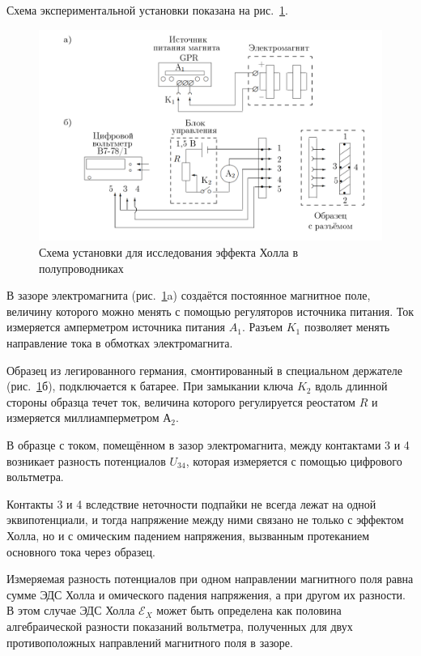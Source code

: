 \documentclass[a4paper, 12pt]{article}
\begin{document}
Схема экспериментальной установки показана на рис.~\ref{ris2}.
	
\begin{figure}[h!]
\begin{center}
    \includegraphics[width=\linewidth]{2.png}
\end{center}
\caption{Схема установки для исследования эффекта Холла в полупроводниках}
\label{ris2}
\end{figure}
  
  	В зазоре электромагнита (рис.~\ref{ris2}a) создаётся постоянное магнитное поле, величину которого можно менять с помощью регуляторов источника питания. Ток измеряется амперметром источника питания $A_{1}$. Разъем $K_{1}$ позволяет менять направление тока в обмотках электромагнита.
  
  	Образец из легированного германия, смонтированный в специальном держателе (рис.~\ref{ris2}б), подключается к батарее. При замыкании ключа $K_{2}$ вдоль длинной стороны образца течет ток, величина которого регулируется реостатом $R$ и измеряется миллиамперметром $А_{2}$.
  	
  	В образце с током, помещённом в зазор электромагнита, между контактами 3 и 4 возникает разность потенциалов $U_{34}$, которая измеряется с помощью цифрового вольтметра.
  	
  	Контакты 3 и 4 вследствие неточности подпайки не всегда лежат на одной
  	эквипотенциали, и тогда напряжение между ними связано не только с эффектом
  	Холла, но и с омическим падением напряжения, вызванным протеканием основного тока через образец.
  	
  	Измеряемая разность потенциалов при одном направлении
  	магнитного поля равна сумме ЭДС Холла и омического падения напряжения, а
  	при другом  их разности. В этом случае ЭДС Холла $\mathscr{E}_{X}$ может быть определена как половина алгебраической разности показаний вольтметра, полученных для
  	двух противоположных направлений магнитного поля в зазоре.
  	
\end{document}
